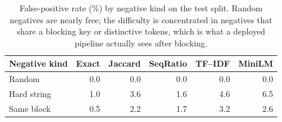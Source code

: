 \begin{table}[t]
\centering
\small
\begin{tabular}{lrrrrr}
\toprule
Negative kind & Exact & Jaccard & SeqRatio & TF--IDF & MiniLM \\
\midrule
Random & 0.0 & 0.0 & 0.0 & 0.0 & 0.0 \\
Hard string & 1.0 & 3.6 & 1.6 & 4.6 & 6.5 \\
Same block & 0.5 & 2.2 & 1.7 & 3.2 & 2.6 \\
\bottomrule
\end{tabular}
\caption{False-positive rate (\%) by negative kind on the test split. Random
negatives are nearly free; the difficulty is concentrated in negatives that share a
blocking key or distinctive tokens, which is what a deployed pipeline actually sees
after blocking.}
\label{tab:negatives}
\end{table}
